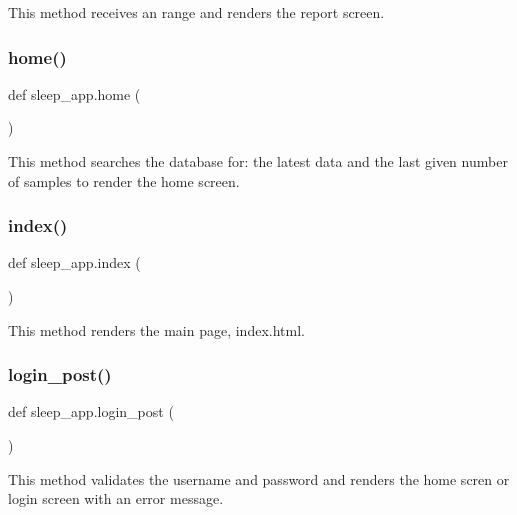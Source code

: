 This method receives an range and renders the report screen. 

\mbox{\label{namespacesleep__app_a921ff5b865384fe3031e92b421c17680}} 
\subsubsection{\texorpdfstring{home()}{home()}}
{\footnotesize\ttfamily def sleep\+\_\+app.\+home (\begin{DoxyParamCaption}{ }\end{DoxyParamCaption})}



This method searches the database for\+: the latest data and the last given number of samples to render the home screen. 

\mbox{\label{namespacesleep__app_a92175618197dfd5a2bc1f0602338bc24}} 
\subsubsection{\texorpdfstring{index()}{index()}}
{\footnotesize\ttfamily def sleep\+\_\+app.\+index (\begin{DoxyParamCaption}{ }\end{DoxyParamCaption})}



This method renders the main page, index.\+html. 

\mbox{\label{namespacesleep__app_a2db458b1854fa62b07151e53ba65648f}} 
\subsubsection{\texorpdfstring{login\+\_\+post()}{login\_post()}}
{\footnotesize\ttfamily def sleep\+\_\+app.\+login\+\_\+post (\begin{DoxyParamCaption}{ }\end{DoxyParamCaption})}



This method validates the username and password and renders the home scren or login screen with an error message. 

